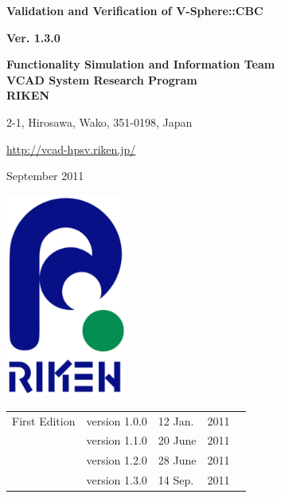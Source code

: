 \documentclass[a4paper,10pt,oneside,fleqn]{jsbook}
\begin{document}
\begin{titlepage}
\begin{center}
\vspace*{3cm}
{\huge \textbf{Validation and Verification of V-Sphere::CBC}}\\
\vspace{1cm}

{\large \textbf{Ver. 1.3.0}}\\
\vspace{1.5cm}

{\large \textbf{Functionality Simulation and Information Team}\\
\large \textbf{VCAD System Research Program}\\
\large \textbf{RIKEN}\\
\vspace{1cm}
}

{\large 2-1, Hirosawa, Wako, 351-0198, Japan}\\
\vspace{0.5cm}

\url{http://vcad-hpsv.riken.jp/}\\
\vspace{1cm}

September 2011\\
\vspace{4cm}

\includegraphics[width=4cm,bb=-80 0 220 500]{RIKEN_logo_300x500.eps}

\end{center}
\end{titlepage}
\newpage

%
\frontmatter

\begin{tabular}{llllr}
First Edition  &  version 1.0.0  & 12 Jan.  & 2011\\
               &  version 1.1.0  & 20 June  & 2011\\
               &  version 1.2.0  & 28 June  & 2011\\
               &  version 1.3.0  & 14 Sep.  & 2011

\end{tabular}
\end{document}
